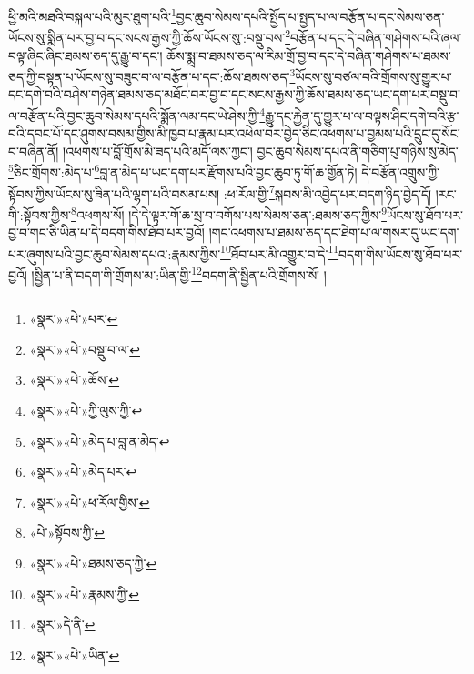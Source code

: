ཕྱི་མའི་མཐའི་བསྐལ་པའི་མུར་ཐུག་པའི་\footnote{«སྣར་»«པེ་»པར་}བྱང་ཆུབ་སེམས་དཔའི་སྤྱོད་པ་སྤྱད་པ་ལ་བརྩོན་པ་དང་སེམས་ཅན་ཡོངས་སུ་སྨིན་པར་བྱ་བ་དང་སངས་རྒྱས་ཀྱི་ཆོས་ཡོངས་སུ་:བསྡུ་བས་\footnote{«སྣར་»«པེ་»བསྡུ་བ་ལ་}བརྩོན་པ་དང་དེ་བཞིན་གཤེགས་པའི་ཞལ་བལྟ་ཞིང་ཞིང་ཐམས་ཅད་དུ་རྒྱུ་བ་དང་། ཆོས་སྨྲ་བ་ཐམས་ཅད་ལ་རིམ་གྲོ་བྱ་བ་དང་དེ་བཞིན་གཤེགས་པ་ཐམས་ཅད་ཀྱི་བསྟན་པ་ཡོངས་སུ་བཟུང་བ་ལ་བརྩོན་པ་དང་:ཆོས་ཐམས་ཅད་\footnote{«སྣར་»«པེ་»ཆོས་}ཡོངས་སུ་བཙལ་བའི་གྲོགས་སུ་གྱུར་པ་དང་དགེ་བའི་བཤེས་གཉེན་ཐམས་ཅད་མཐོང་བར་བྱ་བ་དང་སངས་རྒྱས་ཀྱི་ཆོས་ཐམས་ཅད་ཡང་དག་པར་བསྡུ་བ་ལ་བརྩོན་པའི་བྱང་ཆུབ་སེམས་དཔའི་སྨོན་ལམ་དང་ཡེ་ཤེས་ཀྱི་\footnote{«སྣར་»«པེ་»ཀྱི་ལུས་ཀྱི་}རྒྱུ་དང་རྐྱེན་དུ་གྱུར་པ་ལ་བལྟས་ཤིང་དགེ་བའི་རྩ་བའི་དབང་པོ་དང་ཤུགས་བསམ་གྱིས་མི་ཁྱབ་པ་རྣམ་པར་འཕེལ་བར་བྱེད་ཅིང་འཕགས་པ་བྱམས་པའི་དྲུང་དུ་སོང་བ་བཞིན་ནོ། །འཕགས་པ་བློ་གྲོས་མི་ཟད་པའི་མདོ་ལས་ཀྱང་། བྱང་ཆུབ་སེམས་དཔའ་ནི་གཅིག་པུ་གཉིས་སུ་མེད་\footnote{«སྣར་»«པེ་»མེད་པ་བླ་ན་མེད་}ཅིང་གྲོགས་:མེད་པ་\footnote{«སྣར་»«པེ་»མེད་པར་}བླ་ན་མེད་པ་ཡང་དག་པར་རྫོགས་པའི་བྱང་ཆུབ་ཏུ་གོ་ཆ་གྱོན་ཏེ། དེ་བརྩོན་འགྲུས་ཀྱི་སྟོབས་ཀྱིས་ཡོངས་སུ་ཟིན་པའི་ལྷག་པའི་བསམ་པས། :ཕ་རོལ་གྱི་\footnote{«སྣར་»«པེ་»ཕ་རོལ་གྱིས་}སྐབས་མི་འབྱེད་པར་བདག་ཉིད་བྱེད་དོ། །རང་གི་:སྟོབས་ཀྱིས་\footnote{«པེ་»སྟོབས་ཀྱི་}འཕགས་སོ། །དེ་དེ་ལྟར་གོ་ཆ་སྲ་བ་བགོས་པས་སེམས་ཅན་:ཐམས་ཅད་ཀྱིས་\footnote{«སྣར་»«པེ་»ཐམས་ཅད་ཀྱི་}ཡོངས་སུ་ཐོབ་པར་བྱ་བ་གང་ཅི་ཡིན་པ་དེ་བདག་གིས་ཐོབ་པར་བྱའོ། །གང་འཕགས་པ་ཐམས་ཅད་དང་ཐེག་པ་ལ་གསར་དུ་ཡང་དག་པར་ཞུགས་པའི་བྱང་ཆུབ་སེམས་དཔའ་:རྣམས་ཀྱིས་\footnote{«སྣར་»«པེ་»རྣམས་ཀྱི་}ཐོབ་པར་མི་འགྱུར་བ་དེ་\footnote{«སྣར་»དེ་ནི་}བདག་གིས་ཡོངས་སུ་ཐོབ་པར་བྱའོ། །སྦྱིན་པ་ནི་བདག་གི་གྲོགས་མ་:ཡིན་གྱི་\footnote{«སྣར་»«པེ་»ཡིན་}བདག་ནི་སྦྱིན་པའི་གྲོགས་སོ། །
